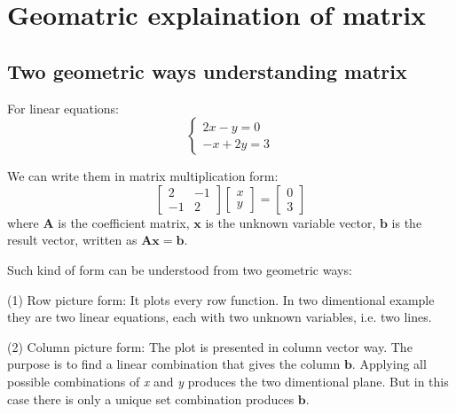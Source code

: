 \documentclass{article}
\begin{document}
\section{Geomatric explaination of matrix}

\subsection{Two geometric ways understanding matrix}

For linear equations:
\begin{equation}
\label{eq:3}
\begin{cases}
2x - y = 0 \\
-x + 2y = 3
\end{cases}
\end{equation}

We can write them in matrix multiplication form:
\begin{equation}
\label{eq:2}
\left[ \begin{array}{cc}
2 & -1\\
-1 & 2
\end{array} \right]
\left[ \begin{array}{c}
x\\y
\end{array} \right] = \left[ \begin{array}{c}
0\\3
\end{array} \right]
\end{equation}
where  $\boldsymbol{A}$ is the coefficient matrix, $\boldsymbol{x}$ is the
unknown variable vector, $\boldsymbol{b}$ is the result vector, written as $\boldsymbol{Ax=b}$.

Such kind of form can be understood from two geometric ways:

(1) Row picture form:
It plots every row function. In two dimentional example they are two linear
equations, each with two unknown variables, i.e. two lines.

(2) Column picture form:
The plot is presented in column vector way. The purpose is to find a linear
combination that gives the column $\boldsymbol{b}$. Applying all possible
combinations of \textit{x} and \textit{y} produces the two dimentional plane.
But in this case there is only a unique set combination produces $\boldsymbol{b}$.
\end{document}
